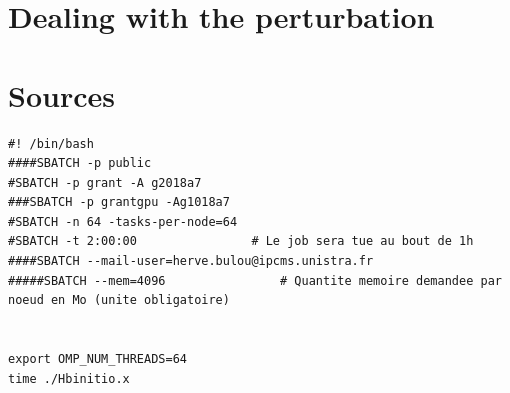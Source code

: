 \documentclass[11pt,a4paper]{article}
\begin{document}
\section{Dealing with the perturbation}


 
\section{Sources}
\label{Sources}


 
\begin{verbatim}
#! /bin/bash
####SBATCH -p public
#SBATCH -p grant -A g2018a7
###SBATCH -p grantgpu -Ag1018a7
#SBATCH -n 64 -tasks-per-node=64
#SBATCH -t 2:00:00                # Le job sera tue au bout de 1h
####SBATCH --mail-user=herve.bulou@ipcms.unistra.fr
#####SBATCH --mem=4096                # Quantite memoire demandee par noeud en Mo (unite obligatoire)


export OMP_NUM_THREADS=64
time ./Hbinitio.x

\end{verbatim}
\end{document}
